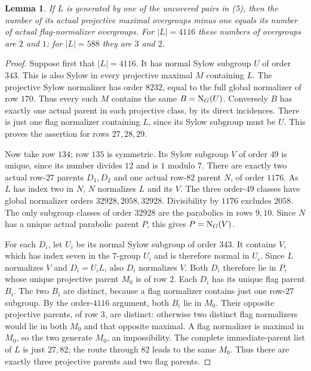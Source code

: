 \documentclass[11pt,a4paper]{article}
\newtheorem{lemma}{Lemma}
\begin{document}
\begin{lemma}\label{flag}
If $L$ is generated by one of the uncovered pairs in (5), then
the number of its actual projective maximal overgroups minus one
equals its number of actual flag-normalizer overgroups.
For $|L|=4116$ these numbers of overgroups are $2$ and $1$;
for $|L|=588$ they are $3$ and $2$.
\end{lemma}
\begin{proof}
Suppose first that $|L|=4116$. It has normal Sylow subgroup $U$
of order $343$. This is also Sylow in every projective maximal
$M$ containing $L$. The projective Sylow normalizer has order
$8232$, equal to the full global normalizer of row $170$.
Thus every such $M$ contains the same $B=\mathrm N_G(U)$.
Conversely $B$ has exactly one actual parent in each projective
class, by its direct incidences. There is just one flag normalizer
containing $L$, since its Sylow subgroup must be $U$. This proves
the assertion for rows $27,28,29$.

Now take row $134$; row $135$ is symmetric. Its Sylow subgroup
$V$ of order $49$ is unique, since its number divides $12$ and
is $1$ modulo $7$. There are exactly two actual row-$27$ parents
$D_1,D_2$ and one actual row-$82$ parent $N$, of order $1176$.
As $L$ has index two in $N$, $N$ normalizes $L$ and its $V$.
The three order-$49$ classes have global normalizer orders
$32928,2058,32928$. Divisibility by $1176$ excludes $2058$.
The only subgroup classes of order $32928$ are the parabolics
in rows $9,10$. Since $N$ has a unique actual parabolic parent
$P$, this gives $P=\mathrm N_G(V)$.

For each $D_i$, let $U_i$ be its normal Sylow subgroup of order
$343$. It contains $V$, which has index seven in the 7-group
$U_i$ and is therefore normal in $U_i$. Since $L$ normalizes $V$
and $D_i=U_iL$, also $D_i$ normalizes $V$. Both $D_i$ therefore
lie in $P$, whose unique projective parent $M_0$ is of row $2$.
Each $D_i$ has its unique flag parent $B_i$. The two $B_i$ are
distinct, because a flag normalizer contains just one row-$27$
subgroup. By the order-$4116$ argument, both $B_i$ lie in $M_0$.
Their opposite projective parents, of row $3$, are distinct:
otherwise two distinct flag normalizers would lie in both $M_0$
and that opposite maximal. A flag normalizer is maximal in $M_0$,
so the two generate $M_0$, an impossibility.
The complete immediate-parent list of $L$ is just $27,82$;
the route through $82$ leads to the same $M_0$. Thus there are
exactly three projective parents and two flag parents.
\end{proof}
\end{document}
